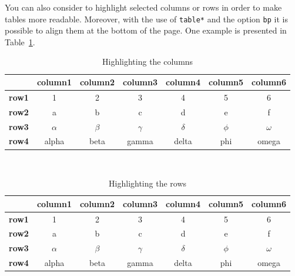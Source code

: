 \documentclass{Configuration_Files/PoliMi3i_thesis}
\begin{document}
You can also consider to highlight selected columns or rows in order to make tables more readable.
Moreover, with the use of \texttt{table*} and the option \texttt{bp} it is possible to align them at the bottom of the page. One example is presented in Table~\ref{table:exampleC}.

\begin{table}[H]
	\centering
	\begin{tabular}{|p{3em} | c | c | c | c | c | c|}
		\hline
		              & \textbf{column1} & \textbf{column2} & \textbf{column3} & \textbf{column4} & \textbf{column5} & \textbf{column6} \T\B \\
		\hline \hline
		\textbf{row1} & 1                & 2                & 3                & 4                & 5                & 6 \T\B                \\
		\textbf{row2} & a                & b                & c                & d                & e                & f \T\B                \\
		\textbf{row3} & $\alpha$         & $\beta$          & $\gamma$         & $\delta$         & $\phi$           & $\omega$ \T\B         \\
		\textbf{row4} & alpha            & beta             & gamma            & delta            & phi              & omega \B              \\
		\hline
	\end{tabular}
	\\[10pt]
	\caption{Highlighting the columns}
	\label{table:exampleC}
\end{table}

\begin{table}[H]
	\centering
	\begin{tabular}{|p{3em} c c c c c c|}
		\hline
		              & \textbf{column1} & \textbf{column2} & \textbf{column3} & \textbf{column4} & \textbf{column5} & \textbf{column6} \T\B \\
		\hline \hline
		\textbf{row1} & 1                & 2                & 3                & 4                & 5                & 6 \T\B                \\
		\hline
		\textbf{row2} & a                & b                & c                & d                & e                & f \T\B                \\
		\hline
		\textbf{row3} & $\alpha$         & $\beta$          & $\gamma$         & $\delta$         & $\phi$           & $\omega$ \T\B         \\
		\hline
		\textbf{row4} & alpha            & beta             & gamma            & delta            & phi              & omega \B              \\
		\hline
	\end{tabular}
	\\[10pt]
	\caption{Highlighting the rows}
	\label{table:exampleR}
\end{table}
\end{document}
